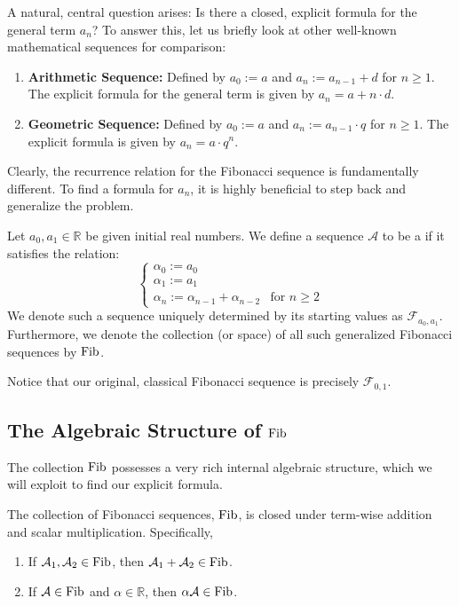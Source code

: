 A natural, central question arises: Is there a closed, explicit formula for the general term $a_n$? To answer this, let us briefly look at other well-known mathematical sequences for comparison:
\begin{enumerate}
    \item \textbf{Arithmetic Sequence:} Defined by $a_0 := a$ and $a_n := a_{n-1} + d$ for $n \ge 1$. The explicit formula for the general term is given by $a_n = a + n \cdot d$.
    \item \textbf{Geometric Sequence:} Defined by $a_0 := a$ and $a_n := a_{n-1} \cdot q$ for $n \ge 1$. The explicit formula is given by $a_n = a \cdot q^n$.
\end{enumerate}

Clearly, the recurrence relation for the Fibonacci sequence is fundamentally different. To find a formula for $a_n$, it is highly beneficial to step back and generalize the problem.

\begin{definition}
\label{def:generalized_fibonacci}
Let $a_0, a_1 \in \mathbb{R}$ be given initial real numbers. We define a sequence $\mathcal{A}$ to be a  if it satisfies the relation:
\begin{equation} \label{eq:generalized_fib_recurrence}
\begin{cases}
\alpha_0 := a_0 \\
\alpha_1 := a_1 \\
\alpha_n := \alpha_{n-1} + \alpha_{n-2} & \text{for } n \ge 2
\end{cases}
\end{equation}
We denote such a sequence uniquely determined by its starting values as $\mathcal{F}_{a_0, a_1}$. Furthermore, we denote the collection (or space) of all such generalized Fibonacci sequences by $\operatorname{Fib}$.
\end{definition}

Notice that our original, classical Fibonacci sequence is precisely $\mathcal{F}_{0, 1}$. 

\subsection{The Algebraic Structure of \texorpdfstring{$\operatorname{Fib}$}{Fib}}

The collection $\operatorname{Fib}$ possesses a very rich internal algebraic structure, which we will exploit to find our explicit formula.

\begin{proposition} \label{prop:fib_closure}
The collection of Fibonacci sequences, $\operatorname{Fib}$, is closed under term-wise addition and scalar multiplication. Specifically,
\begin{enumerate}
    \item If $\mathcal{A}_1, \mathcal{A}_2 \in \operatorname{Fib}$, then $\mathcal{A}_1 + \mathcal{A}_2 \in \operatorname{Fib}$.
    \item If $\mathcal{A} \in \operatorname{Fib}$ and $\alpha \in \mathbb{R}$, then $\alpha \mathcal{A} \in \operatorname{Fib}$.
\end{enumerate}
\end{proposition}

